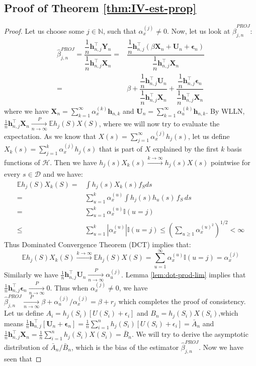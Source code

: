 \documentclass[
  12pt]{article}
\newcommand{\pnlim}{\xrightarrow[n \to \infty]{P}}
\newcommand{\klim}{\xrightarrow[]{k \to \infty}}
\newcommand{\calD}{\mathcal{D}}
\newcommand{\calH}{\mathcal{H}}
\newcommand{\N}{\mathbb{N}}
\newcommand{\bX}{\boldsymbol{X}}
\newcommand{\bY}{\boldsymbol{Y}}
\newcommand{\bh}{\boldsymbol{h}}
\newcommand{\bU}{\boldsymbol{U}}
\newcommand{\beps}{\boldsymbol{\epsilon}}
\newcommand{\E}{\mathbb{E}}
\begin{document}
\subsection{Proof of Theorem \ref{thm:IV-est-prop}}\label{thm:IV-est-prop-proof}
\begin{proof}
Let us choose some $j \in \N$, such that $\alpha_x^{(j)}\neq 0$. Now, let us look at $\hat{\beta}_{j,n}^{PROJ}$:
    $$
    \begin{aligned}
        \hat{\beta}_{j,n}^{PROJ}  = \dfrac{\dfrac{1}{n}\bh_{n,j}^\top\bY_{n}}{\dfrac{1}{n}\bh_{n,j}^\top\bX_{n}} = & \dfrac{\dfrac{1}{n}\bh_{n,j}^\top(\beta\bX_{n}+\bU_{n} + \beps_{n})}{\dfrac{1}{n}\bh_{n,j}^\top\bX_{n}}\\
        = & \beta + \dfrac{\dfrac{1}{n}\bh_{n,j}^\top\bU_{n}}{\dfrac{1}{n}\bh_{n,j}^\top\bX_{n}} + \dfrac{\dfrac{1}{n}\bh_{n,j}^\top\beps_{n}}{\dfrac{1}{n}\bh_{n,j}^\top\bX_{n}}
    \end{aligned}
    $$
where we have $\bX_{n} = \sum_{k=1}^\infty\alpha_x^{(k)}\bh_{n,k}$ and $\bU_n = \sum_{k=1}^\infty\alpha_u^{(k)}\bh_{n,k}$. By WLLN, $\frac{1}{n}\bh_{n,j}^\top\bX_n \pnlim \E h_j(S)X(S)$, where we will now try to evaluate the expectation. As we know that $X(s) = \sum_{j=1}^\infty\alpha_{x}^{(j)}h_j(s)$, let us define $X_{k}(s) = \sum_{j=1}^k\alpha_{x}^{(j)}h_j(s)$ that is part of $X$ explained by the first $k$ basis functions of $\calH$. Then we have $h_j(s)X_{k}(s) \klim h_j(s)X(s)$ pointwise for every $s \in \calD$ and we have:
$$
\begin{aligned}
\E h_j(S)X_{k}(S) =&\int h_j(s)X_{k}(s)f_Sds\\
= & \sum_{u=1}^k\alpha_x^{(u)}\int h_j(s)h_u(s)\,f_S\,ds\\
= & \sum_{u=1}^k\alpha_x^{(u)}\mathbb{I}(u=j)\\
\leq & \sum_{u=1}^k\left|\alpha_x^{(u)}\right|\mathbb{I}(u=j)\leq \left(\sum_{u \geq 1} \alpha_x^{(u)^2}\right)^{1/2}< \infty
\end{aligned}
$$
Thus Dominated Convergence Theorem (DCT) implies that:
$$
\E h_j(S)X_{k}(S) \klim \E h_j(S)X(S) = \sum_{u=1}^\infty\alpha_x^{(u)}\mathbb{I}(u=j) = \alpha_x^{(j)}
$$
Similarly we have $\frac{1}{n}\bh_{n,j}^\top\bU_n \pnlim \alpha_u^{(j)}$. Lemma \ref{lem:dot-prod-lim} implies that $\frac{1}{n}\bh_{n,j}^\top\beps_n \pnlim 0$. Thus when $\alpha_x^{(j)} \neq 0$, we have $\hat{\beta}_{j,n}^{PROJ} \pnlim \beta + \alpha_u^{(j)}/\alpha_x^{(j)} = \beta + r_j$ which completes the proof of consistency.
Let us define $A_i = h_j(S_i)[U(S_i)+\epsilon_i]$ and $B_n = h_j(S_i)X(S_i)$,which means $\frac{1}{n}\bh_{n,j}^\top[\bU_n+\beps_n] = \frac{1}{n}\sum_{i=1}^nh_j(S_i)[U(S_i)+\epsilon_i] = \bar{A}_n$ and $\frac{1}{n}\bh_{n,j}^\top\bX_n = \frac{1}{n}\sum_{i=1}^nh_j(S_i)X(S_i) = \bar{B}_n$. We will try to derive the asymptotic distribution of $\bar{A}_n/\bar{B}_n$, which is the bias of the estimator $\hat{\beta}^{PROJ}_{j,n}$. Now we have seen that 

\end{proof}
\end{document}
